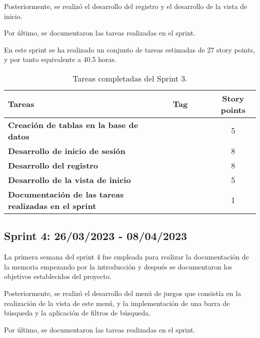 Posteriormente, se realizó el desarrollo del registro y el desarrollo de la vista de inicio.

Por último, se documentaron las tareas realizadas en el sprint.

En este sprint se ha realizado un conjunto de tareas estimadas de 27 story points, y por tanto equivalente a 40.5 horas.

\begin{table}[ht!]
    \centering
    \resizebox{15cm}{!} {
    \begin{tabular}{|l|c|c|}
    \hline
    \rowcolor[rgb]{0.99,0.93,0.93}
    \textbf{Tareas}     &\textbf{Tag}     & \textbf{Story points} \\ \hline
    \textbf{Creación de tablas en la base de datos}         &\cellcolor[rgb]{0.99,0.83,0.93}\textcolor{white}{development}      &5 \\ \hline 
    \textbf{Desarrollo de inicio de sesión}         &\cellcolor[rgb]{0.99,0.83,0.93}\textcolor{white}{development}      &8 \\ \hline 
    \textbf{Desarrollo del registro}         &\cellcolor[rgb]{0.99,0.83,0.93}\textcolor{white}{development}      &8 \\ \hline 
    \textbf{Desarrollo de la vista de inicio}         &\cellcolor[rgb]{0.99,0.83,0.93}\textcolor{white}{development}      &5 \\ \hline 
    \textbf{Documentación de las tareas realizadas en el sprint}         &\cellcolor[rgb]{0.0,0.33,0.71}\textcolor{white}{documentation}      &1 \\ \hline 
    \end{tabular}}
    \caption{Tareas completadas del Sprint 3.}
    \label{tab:my_label}
\end{table}

\subsection{Sprint 4: 26/03/2023 - 08/04/2023}
La primera semana del sprint 4 fue empleada para realizar la documentación de la memoria empezando por la introducción y después se documentaron los objetivos establecidos del proyecto.

Posteriormente, se realizó el desarrollo del menú de juegos que consistía en la realización de la vista de este menú, y la implementación de una barra de búsqueda y la aplicación de filtros de búsqueda.

Por último, se documentaron las tareas realizadas en el sprint.

